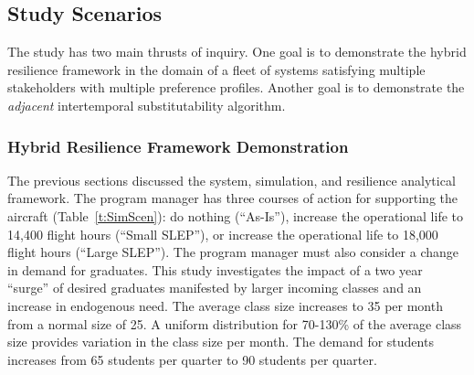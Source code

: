 \subsection{Study Scenarios}

The study has two main thrusts of inquiry. One goal is to demonstrate
the hybrid resilience framework in the domain of a fleet of systems
satisfying multiple stakeholders with multiple preference
profiles. Another goal is to demonstrate the \emph{adjacent}
intertemporal substitutability algorithm.

\subsubsection{Hybrid Resilience Framework Demonstration}

The previous sections discussed the system, simulation, and resilience
analytical framework. The program manager has three courses of action
for supporting the aircraft (Table~\ref{t:SimScen}): do nothing
(``As-Is''), increase the operational life to 14,400 flight hours
(``Small SLEP''), or increase the operational life to 18,000 flight
hours (``Large SLEP''). The program manager must also consider a
change in demand for graduates. This study investigates the impact of
a two year ``surge'' of desired graduates manifested by larger
incoming classes and an increase in endogenous need. The average class
size increases to 35 per month from a normal size of 25. A uniform
distribution for 70-130\% of the average class size 
provides variation in the class size per month. The demand
for students increases from 65 students per quarter to 90 students per
quarter. 

\begin{table}[h]
    \caption{SLEP Courses of Action}
  \label{t:SimScen}
\end{table}

